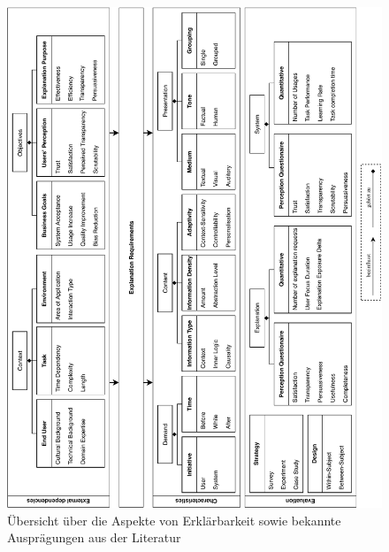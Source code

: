 \begin{figure}[htb!]
    \begin{center}
        \includegraphics[width=\textwidth]{contents/05_model_description/res/model_complete_overview.pdf}
    \end{center}
    \caption{Übersicht über die Aspekte von Erklärbarkeit sowie bekannte Ausprägungen aus der Literatur}
    \label{fig:model_overview_complete}
\end{figure}

\newpage